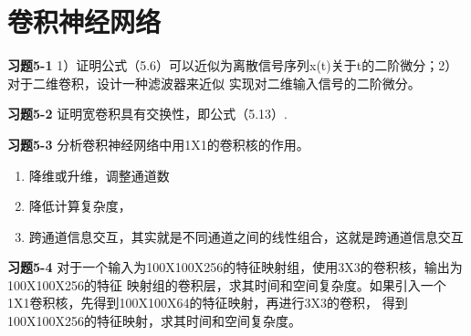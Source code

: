 \section{卷积神经网络}

\noindent\textbf{习题5-1} 1）证明公式（5.6）可以近似为离散信号序列x(t)关于t的二阶微分；2）对于二维卷积，设计一种滤波器来近似
实现对二维输入信号的二阶微分。

\noindent\textbf{习题5-2} 证明宽卷积具有交换性，即公式（5.13）.

\noindent\textbf{习题5-3} 分析卷积神经网络中用1X1的卷积核的作用。

\begin{enumerate}
\item 降维或升维，调整通道数
\item 降低计算复杂度，
\item 跨通道信息交互，其实就是不同通道之间的线性组合，这就是跨通道信息交互
\end{enumerate}

\noindent\textbf{习题5-4} 对于一个输入为100X100X256的特征映射组，使用3X3的卷积核，输出为100X100X256的特征
映射组的卷积层，求其时间和空间复杂度。如果引入一个1X1卷积核，先得到100X100X64的特征映射，再进行3X3的卷积，
得到100X100X256的特征映射，求其时间和空间复杂度。

